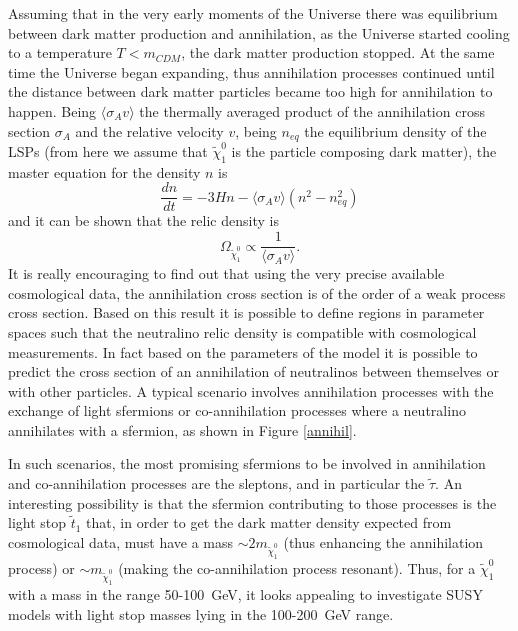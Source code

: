 Assuming that in the very early moments of the Universe there was equilibrium between dark matter production and annihilation, as the Universe started cooling to a temperature $T<m_{CDM}$, the dark matter production stopped. At the same time the Universe began expanding, thus annihilation processes continued until the distance between dark matter particles became too high for annihilation to happen. Being $\langle\sigma_A v\rangle$ the thermally averaged product of the annihilation cross section $\sigma_A$ and the relative velocity $v$, being $n_{eq}$ the equilibrium density of the LSPs (from here we assume that $\tilde\chi^0_1$ is the particle composing dark matter), the master equation for the density $n$ is \begin{equation}\label{eq:density}
\dfrac{dn}{dt} = -3Hn - \langle\sigma_A v\rangle(n^2 - n_{eq}^2)
\end{equation} and it can be shown \cite{book:kolb} that the relic density is\begin{equation}\label{eq:annihilXsec}
\Omega_{\tilde\chi^0_1} \propto \dfrac{1}{\langle\sigma_A v\rangle}.
\end{equation} It is really encouraging to find out that using the very precise available cosmological data, the annihilation cross section is of the order of a weak process cross section. Based on this result it is possible to define regions in parameter spaces such that the neutralino relic density is compatible with cosmological measurements. In fact based on the parameters of the model it is possible to predict the cross section of an annihilation of neutralinos between themselves or with other particles. A typical scenario involves annihilation processes with the exchange of light sfermions or co-annihilation processes where a neutralino annihilates with a sfermion, as shown in Figure \ref{annihil}.

In such scenarios, the most promising sfermions to be involved in annihilation and co-annihilation processes are the sleptons, and in particular the $\tilde\tau$. An interesting possibility is that the sfermion contributing to those processes is the light stop $\tilde t_1$ that, in order to get the dark matter density expected from cosmological data, must have a mass $\sim 2m_{\tilde\chi^0_1}$ (thus enhancing the annihilation process) or $\sim m_{\tilde\chi^0_1}$ (making the co-annihilation process resonant). Thus, for a $\tilde\chi^0_1$ with a mass in the range 50-100~GeV, it looks appealing to investigate SUSY models with light stop masses lying in the 100-200~GeV range.

